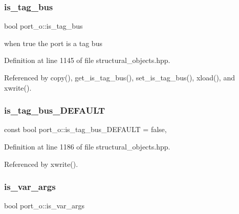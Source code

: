 \subsubsection{\texorpdfstring{is\+\_\+tag\+\_\+bus}{is\_tag\_bus}}
{\footnotesize\ttfamily bool port\+\_\+o\+::is\+\_\+tag\+\_\+bus\hspace{0.3cm}{\ttfamily [private]}}



when true the port is a tag bus 



Definition at line 1145 of file structural\+\_\+objects.\+hpp.



Referenced by copy(), get\+\_\+is\+\_\+tag\+\_\+bus(), set\+\_\+is\+\_\+tag\+\_\+bus(), xload(), and xwrite().

\mbox{\label{structport__o_aa5e604b60bd505030bfdd8cc62078d6a}} 
\subsubsection{\texorpdfstring{is\+\_\+tag\+\_\+bus\+\_\+\+D\+E\+F\+A\+U\+LT}{is\_tag\_bus\_DEFAULT}}
{\footnotesize\ttfamily const bool port\+\_\+o\+::is\+\_\+tag\+\_\+bus\+\_\+\+D\+E\+F\+A\+U\+LT = false\hspace{0.3cm}{\ttfamily [static]}, {\ttfamily [private]}}



Definition at line 1186 of file structural\+\_\+objects.\+hpp.



Referenced by xwrite().

\mbox{\label{structport__o_a6f9652fa41e44cf518ea9f8c3383b984}} 
\subsubsection{\texorpdfstring{is\+\_\+var\+\_\+args}{is\_var\_args}}
{\footnotesize\ttfamily bool port\+\_\+o\+::is\+\_\+var\+\_\+args\hspace{0.3cm}{\ttfamily [private]}}



